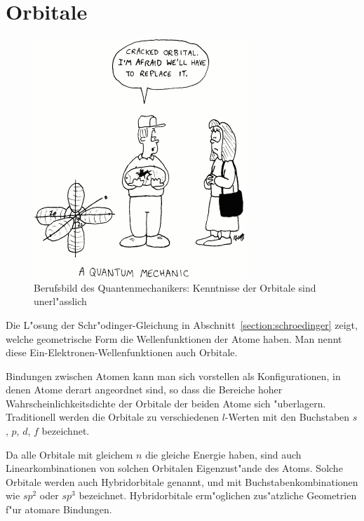 \section{Orbitale}
\begin{figure}
\centering
\includegraphics[width=0.4\hsize]{images/crackedorbital.png}
\caption{Berufsbild des Quantenmechanikers: Kenntnisse der Orbitale
sind unerl"asslich\label{skript:crackedorbital}}
\end{figure}
Die L"osung der Schr"odinger-Gleichung in Abschnitt~\ref{section:schroedinger} 
zeigt, welche geometrische Form die Wellenfunktionen der Atome haben.
Man nennt diese Ein-Elektronen-Wellenfunktionen auch Orbitale.

Bindungen zwischen Atomen kann man sich vorstellen als Konfigurationen,
in denen Atome derart angeordnet sind, so dass die Bereiche hoher
Wahrscheinlichkeitsdichte der Orbitale der beiden Atome sich "uberlagern.
Traditionell werden die Orbitale zu verschiedenen $l$-Werten mit den
Buchstaben $s$, $p$, $d$, $f$ bezeichnet.

Da alle Orbitale mit gleichem $n$ die gleiche Energie haben, sind auch
Linearkombinationen von solchen Orbitalen Eigenzust"ande des Atoms.
Solche Orbitale werden auch Hybridorbitale genannt, und mit
Buchstabenkombinationen wie $sp^2$ oder $sp^3$ bezeichnet.
Hybridorbitale erm"oglichen zus"atzliche Geometrien f"ur atomare Bindungen.


